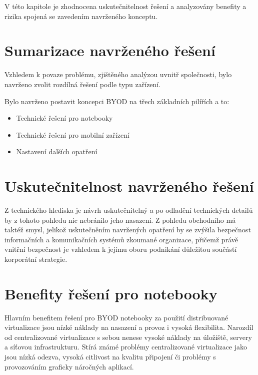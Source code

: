 V této kapitole je zhodnocena uskutečnitelnost řešení a analyzovány benefity a rizika spojená se zavedením navrženého konceptu.

\section{Sumarizace navrženého řešení}
Vzhledem k povaze problému, zjištěného analýzou uvnitř společnosti, bylo navrženo zvolit rozdílná řešení podle typu zařízení.

Bylo navrženo postavit koncepci BYOD na třech základních pilířích a to:

\begin{itemize}
    \item Technické řešení pro notebooky
    \item Technické řešení pro mobilní zařízení
    \item Nastavení dalších opatření
\end{itemize}


\section{Uskutečnitelnost navrženého řešení}
Z technického hlediska je návrh uskutečnitelný a po odladění technických detailů by z tohoto pohledu nic nebránilo jeho nasazení. Z pohledu obchodního má taktéž smysl, jelikož uskutečněním navržených opatření by se zvýšila bezpečnost informačních a komunikačních systémů zkoumané organizace, přičemž právě vnitřní bezpečnost je vzhledem k jejímu oboru podnikání důležitou součástí korporátní strategie. 

\section{Benefity řešení pro notebooky}

Hlavním benefitem řešení pro BYOD notebooky za použití distribuované virtualizace jsou nízké náklady na nasazení a provoz i vysoká flexibilita. Narozdíl od centralizované virtualizace s sebou nenese vysoké náklady na úložiště, servery a síťovou infrastrukturu. Stírá známé problémy centralizované virtualizace jako jsou nízká odezva, vysoká citlivost na kvalitu připojení či problémy s provozováním graficky náročných aplikací.

